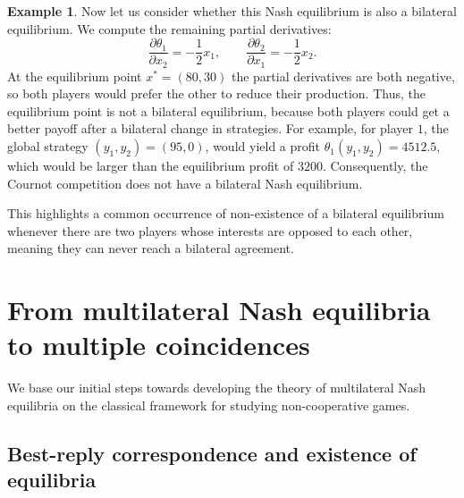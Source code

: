 \documentclass[a4paper,11pt,reqno,english]{amsart}
\theoremstyle{plain}
\theoremstyle{definition}
\newtheorem{example}[theorem]{Example}
\begin{document}
\begin{example}
	\medskip
	Now let us consider whether this Nash equilibrium is also a bilateral equilibrium. We compute the remaining partial derivatives:
	\begin{displaymath}
		\frac{\partial\theta_1}{\partial x_2}  = -\frac{1}{2}x_1, \qquad \frac{\partial\theta_2}{\partial x_1}  = -\frac{1}{2}x_2.
	\end{displaymath}
	At the equilibrium point $x^*=(80,30)$ the partial derivatives are both negative, so both players would prefer the other to reduce their production.
	Thus, the equilibrium point is not a bilateral equilibrium, because both players could get a better payoff after a bilateral change in strategies.
	For example, for player $1$, the global strategy $(y_1, y_2) = (95, 0)$, would yield a profit $\theta_1(y_1,y_2) = 4512.5$, which would be larger than the equilibrium profit of $3200$.
	Consequently, the Cournot competition does not have a bilateral Nash equilibrium.

	\medskip
	This highlights a common occurrence of non-existence of a bilateral equilibrium whenever there are two players whose interests are opposed to each other, meaning they can never reach a bilateral agreement.
\end{example}





\section{From multilateral Nash equilibria to multiple coincidences}\label{sec:MultipleCoincidences}

We base our initial steps towards developing the theory of multilateral Nash equilibria on the classical framework for studying non-cooperative games.

\subsection{Best-reply correspondence and existence of equilibria}
\end{document}
